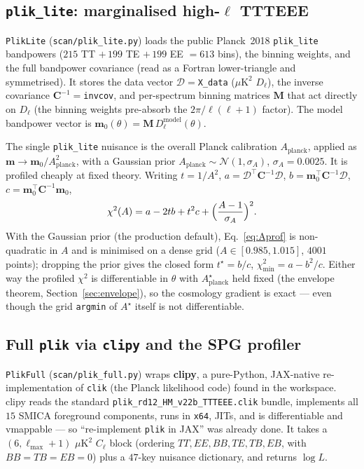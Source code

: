 \documentclass[11pt]{article}
\newcommand{\code}[1]{\texttt{\small #1}}
\newcommand{\file}[1]{\texttt{\small #1}}
\newcommand{\Cl}{C_\ell}
\newcommand{\Dl}{D_\ell}
\newcommand{\chisq}{\chi^2}
\newcommand{\Lmax}{\ell_{\max}}
\begin{document}
\subsection{\texttt{plik\_lite}: marginalised high-$\ell$ TTTEEE}
\label{sec:pliklite}

\code{PlikLite} (\file{scan/plik\_lite.py}) loads the public Planck~2018
\code{plik\_lite} bandpowers ($215$ TT $+\,199$ TE $+\,199$ EE $=613$
bins), the binning weights, and the full bandpower covariance (read as a
Fortran lower-triangle and symmetrised). It stores the data vector
$\bm{\mathcal D}=$\code{X\_data} ($\mu\mathrm{K}^2$ $\Dl$), the inverse
covariance $\bm C^{-1}=$\code{invcov}, and per-spectrum binning matrices
$\bm M$ that act directly on $\Dl$ (the binning weights pre-absorb the
$2\pi/\ell(\ell+1)$ factor). The model bandpower vector is $\bm
m_0(\theta)=\bm M\,\Dl^{\mathrm{model}}(\theta)$.

The single \code{plik\_lite} nuisance is the overall Planck calibration
$A_{\mathrm{planck}}$, applied as $\bm m\to\bm m_0/A_{\mathrm{planck}}^2$,
with a Gaussian prior $A_{\mathrm{planck}}\sim\mathcal N(1,\sigma_A)$,
$\sigma_A=0.0025$. It is profiled cheaply at fixed theory. Writing
$t=1/A^2$, $a=\bm{\mathcal D}^\top\bm C^{-1}\bm{\mathcal D}$,
$b=\bm m_0^\top\bm C^{-1}\bm{\mathcal D}$,
$c=\bm m_0^\top\bm C^{-1}\bm m_0$,
\begin{equation}
\chisq(A)=a-2tb+t^2c+\Bigl(\frac{A-1}{\sigma_A}\Bigr)^2 .
\label{eq:Aprof}
\end{equation}
With the Gaussian prior (the production default), Eq.~\eqref{eq:Aprof} is
non-quadratic in $A$ and is minimised on a dense grid
($A\in[0.985,1.015]$, $4001$ points); dropping the prior gives the closed
form $t^\star=b/c$, $\chisq_{\min}=a-b^2/c$. Either way the profiled
$\chisq$ is differentiable in $\theta$ with $A_{\mathrm{planck}}^\star$
held fixed (the envelope theorem, Section~\ref{sec:envelope}), so the
cosmology gradient is exact --- even though the grid \code{argmin} of
$A^\star$ itself is not differentiable.

\subsection{Full \texttt{plik} via \texttt{clipy} and the SPG profiler}
\label{sec:plikfull}

\code{PlikFull} (\file{scan/plik\_full.py}) wraps \textbf{clipy}, a
pure-Python, JAX-native re-implementation of \code{clik} (the Planck
likelihood code) found in the workspace. clipy reads the standard
\code{plik\_rd12\_HM\_v22b\_TTTEEE.clik} bundle, implements all $15$
SMICA foreground components, runs in \code{x64}, JITs, and is
differentiable and vmappable --- so ``re-implement \code{plik} in JAX''
was already done. It takes a $(6,\Lmax{+}1)$ $\mu\mathrm{K}^2$ $\Cl$ block
(ordering $TT,EE,BB,TE,TB,EB$, with $BB{=}TB{=}EB{=}0$) plus a $47$-key
nuisance dictionary, and returns $\log L$.
\end{document}
